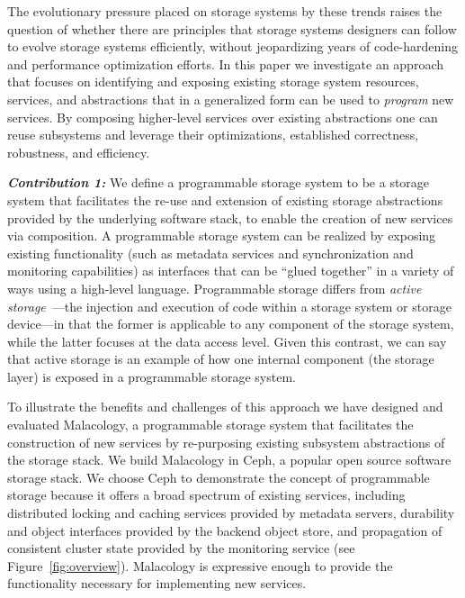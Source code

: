 The evolutionary pressure placed on storage systems by these trends raises the
question of whether there are principles that storage systems designers can
follow to evolve storage systems efficiently, without jeopardizing years of
code-hardening and performance optimization efforts.  In this paper we
investigate an approach that focuses on identifying and exposing existing
storage system resources, services, and abstractions that in a generalized form
can be used to \emph{program} new services. By composing higher-level services
over existing abstractions one can reuse subsystems and leverage their
optimizations, established correctness, robustness, and efficiency. 

{\it \textbf{Contribution 1:}} We define a programmable storage system to be a
storage system that facilitates the re-use and extension of existing storage
abstractions provided by the underlying software stack, to enable the creation
of new services via composition.  A programmable storage system can be realized
by exposing existing functionality (such as  metadata services and synchronization and monitoring capabilities) as
interfaces that can be ``glued together'' in a variety of ways using a
high-level language. Programmable storage differs from \emph{active
storage}~\cite{riedel:vldb98}---the injection and execution of code within a
storage system or storage device---in that the former is applicable to any
component of the storage system, while the latter focuses at the data access
level. Given this contrast, we can say that active storage is an example of how
one internal component (the storage layer) is exposed in a programmable storage
system.  

To illustrate the benefits and challenges of this approach we have designed and
evaluated Malacology, a programmable storage system that facilitates the
construction of new services by re-purposing existing subsystem abstractions of
the storage stack.  We build Malacology in Ceph, a popular open source software
storage stack.  We choose Ceph to demonstrate the concept of programmable
storage because it offers a broad spectrum of existing services, including
distributed locking and caching services provided by  metadata servers, durability and object interfaces provided by the
backend object store, and propagation of consistent cluster state provided by
the monitoring service (see Figure~\ref{fig:overview}).  Malacology is
expressive enough to provide the functionality necessary for implementing new
services.  

